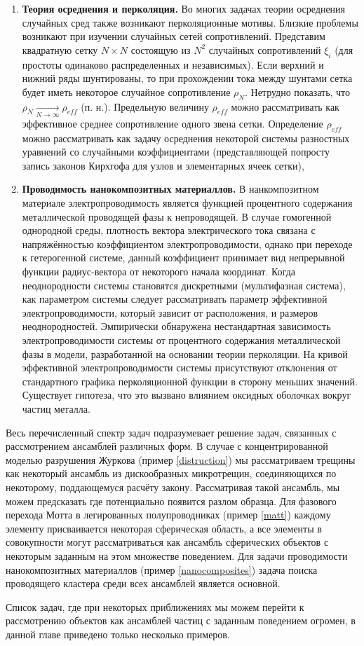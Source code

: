 \begin{enumerate}
    \item \label{averaging}
    \textbf{Теория осреднения и перколяция.} \newline
        Во многих задачах теории осреднения случайных сред также возникают перколяционные мотивы. Близкие проблемы возникают при изучении случайных сетей сопротивлений. Представим квадратную сетку $N \times N$ состоящую из $N^2$ случайных сопротивлений $\xi_{i}$ (для простоты одинаково распределенных и независимых). Если верхний и нижний ряды шунтированы, то при прохождении тока между шунтами сетка будет иметь некоторое случайное сопротивление $\rho_{N}$. Нетрудно показать, что $\rho_{N}\xrightarrow[N\rightarrow\infty]{}\rho_{eff}$ (п. н.). Предельную величину $\rho_{eff}$ можно рассматривать как эффективное среднее сопротивление одного звена сетки. Определение $\rho_{eff}$ можно рассматривать как задачу осреднения некоторой системы разностных уравнений со случайными коэффициентами (представляющей попросту запись законов Кирхгофа для узлов и элементарных ячеек сетки),
    \item \label{nanocomposites}
    \textbf{Проводимость нанокомпозитных материаллов.}
        В нанкомпозитном материале электропроводимость является функцией процентного содержания металлической проводящей фазы к непроводящей. В случае гомогенной однородной среды, плотность вектора электрического тока связана с напряжённостью коэффициентом электропроводимости, однако при переходе к гетерогенной системе, данный коэффициент принимает вид непрерывной функции радиус-вектора от некоторого начала координат. Когда неоднородности системы становятся дискретными (мультифазная система), как параметром системы следует рассматривать параметр эффективной электропроводимости, который зависит от расположения, и размеров неоднородностей. Эмпирически обнаружена нестандартная зависимость электропроводимости системы от процентного содержания металлической фазы в модели, разработанной на основании теории перколяции. На кривой эффективной электропроводимости системы присутствуют отклонения от стандартного графика перколяционной функции в сторону меньших значений. Существует гипотеза, что это вызвано влиянием оксидных оболочках вокруг частиц металла.
\end{enumerate}

Весь перечисленный спектр задач подразумевает решение задач, связанных с рассмотрением ансамблей различных форм. В случае с концентрированной моделью разрушения Журкова (пример \ref{distruction}) мы рассматриваем трещины как некоторый ансамбль из дискообразных микротрещин, соединяющихся по некоторому, поддающемуся расчёту закону. Рассматривая такой ансамбль, мы можем предсказать где потенциально появится разлом образца. Для фазового перехода Мотта в легированных полупроводниках (пример \ref{matt}) каждому элементу присваивается некоторая сферическая область, а все элементы в совокупности могут рассматриваться как ансамбль сферических объектов с некоторым заданным на этом множестве поведением. Для задачи проводимости нанокомпозитных материаллов (пример \ref{nanocomposites}) задача поиска проводящего кластера среди всех ансамблей является основной.


Список задач, где при некоторых приближениях мы можем перейти к рассмотрению объектов как ансамблей частиц с заданным поведением огромен, в данной главе приведено только несколько примеров.  